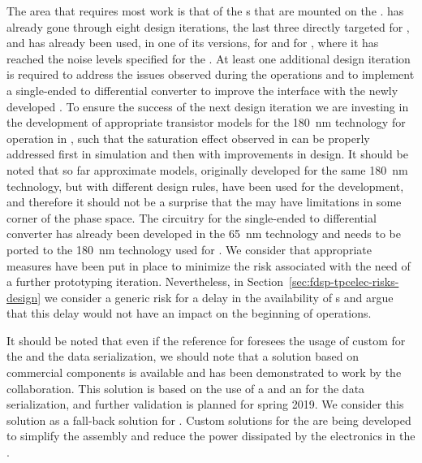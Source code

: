 The area that requires most work is that of the s that are mounted
on the .  has already gone through eight design
iterations, the last three directly targeted for , and has already been used, 
in one of its versions, for  and for , where it has reached the 
noise levels specified for the  . At least one additional design iteration is
required to address the issues observed during the  operations and
to implement a single-ended to differential converter to improve the interface
with the newly developed . To ensure the success of the next 
design iteration we are investing in the development of appropriate transistor
models for the \SI{180}{nm}  technology for operation in \lar, such that the saturation effect observed in 
 can be properly addressed first in simulation and then with improvements 
in design. It should be noted that so far approximate models, originally developed for 
the same \SI{180}{nm} technology, but with different design rules, have been used for 
the  development, and therefore it should not be a surprise
that the  may have limitations in some corner of the phase space.
The circuitry for the single-ended to differential converter has already been 
developed in the \SI{65}{nm} technology and needs to be ported to the \SI{180}{nm}
technology used for . We consider that appropriate measures have been
put in place to minimize the risk associated with the need of a further
prototyping iteration. Nevertheless, in Section~\ref{sec:fdsp-tpcelec-risks-design}
we consider a generic risk for a delay in the availability of s and
argue that this delay would not have an impact on the beginning of  operations.

It should be noted that even if the reference for  foresees the usage
of custom  for the  and the data serialization, we should
note that a solution based on commercial components is available and has been 
demonstrated to work by the  collaboration. This solution is based on
the use of a   and an  for the data serialization,
and further validation is planned for spring 2019. We consider this solution as
a fall-back solution for . Custom solutions for the  are 
being developed to simplify the  assembly and reduce the power dissipated by the
electronics in the \lar.

